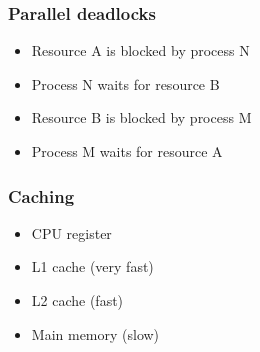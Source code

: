 \documentclass[usenames,dvipsnames,mathserif,compress]{beamer}
\begin{document}
\begin{frame}
  \frametitle{Parallel deadlocks}
  \begin{itemize}
  \item Resource A is blocked by process N
  \item Process N waits for resource B
  \item Resource B is blocked by process M
  \item Process M waits for resource A
  \end{itemize}
\end{frame}






\begin{frame}
  \frametitle{Caching}
  \begin{itemize}
  \item CPU register
  \item L1 cache (very fast)
  \item L2 cache (fast)
  \item Main memory (slow)
  \end{itemize}
\end{frame}





\end{document}
